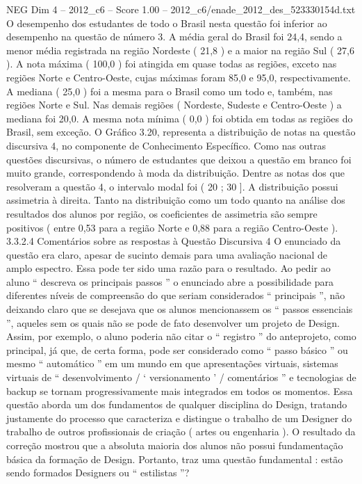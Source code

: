 \begin{textsample}{NEG Dim 4 – 2012\_c6 – Score 1.00 – 2012\_c6/enade\_2012\_des\_523330154d.txt}
O desempenho dos estudantes de todo o Brasil nesta questão foi inferior ao desempenho na questão de número 3.
A média geral do Brasil foi 24,4, sendo a menor média registrada na região Nordeste ( 21,8 ) e a maior na região Sul ( 27,6 ).
A nota máxima ( 100,0 ) foi atingida em quase todas as regiões, exceto nas regiões Norte e Centro-Oeste, cujas máximas foram 85,0 e 95,0, respectivamente.
A mediana ( 25,0 ) foi a mesma para o Brasil como um todo e, também, nas regiões Norte e Sul.
Nas demais regiões ( Nordeste, Sudeste e Centro-Oeste ) a mediana foi 20,0.
A mesma nota mínima ( 0,0 ) foi obtida em todas as regiões do Brasil, sem exceção.
O Gráfico 3.20, representa a distribuição de notas na questão discursiva 4, no componente de Conhecimento Específico.
Como nas outras questões discursivas, o número de estudantes que deixou a questão em branco foi muito grande, correspondendo à moda da distribuição.
Dentre as notas dos que resolveram a questão 4, o intervalo modal foi ( 20 ; 30 ].
A distribuição possui assimetria à direita.
Tanto na distribuição como um todo quanto na análise dos resultados dos alunos por região, os coeficientes de assimetria são sempre positivos ( entre 0,53 para a região Norte e 0,88 para a região Centro-Oeste ). 3.3.2.4 Comentários sobre as respostas à Questão Discursiva 4 O enunciado da questão era claro, apesar de sucinto demais para uma avaliação nacional de amplo espectro.
Essa pode ter sido uma razão para o resultado.
Ao pedir ao aluno “ descreva os principais passos ” o enunciado abre a possibilidade para diferentes níveis de compreensão do que seriam considerados “ principais ”, não deixando claro que se desejava que os alunos mencionassem os “ passos essenciais ”, aqueles sem os quais não se pode de fato desenvolver um projeto de Design.
Assim, por exemplo, o aluno poderia não citar o “ registro ” do anteprojeto, como principal, já que, de certa forma, pode ser considerado como “ passo básico ” ou mesmo “ automático ” em um mundo em que apresentações virtuais, sistemas virtuais de “ desenvolvimento / ‘ versionamento ’ / comentários ” e tecnologias de backup se tornam progressivamente mais integrados em todos os momentos.
Essa questão aborda um dos fundamentos de qualquer disciplina do Design, tratando justamente do processo que caracteriza e distingue o trabalho de um Designer do trabalho de outros profissionais de criação ( artes ou engenharia ).
O resultado da correção mostrou que a absoluta maioria dos alunos não possui fundamentação básica da formação de Design.
Portanto, traz uma questão fundamental : estão sendo formados Designers ou “ estilistas ”?

\end{textsample}
